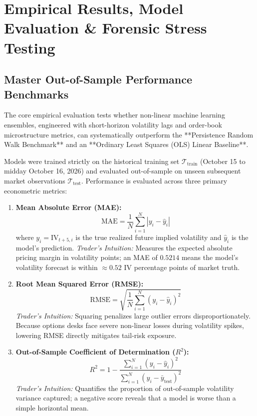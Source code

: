 \chapter{Empirical Results, Model Evaluation \& Forensic Stress Testing}
\label{chap:results}

\section{Master Out-of-Sample Performance Benchmarks}
\label{sec:master_benchmarks}

The core empirical evaluation tests whether non-linear machine learning ensembles, engineered with short-horizon volatility lags and order-book microstructure metrics, can systematically outperform the **Persistence Random Walk Benchmark** and an **Ordinary Least Squares (OLS) Linear Baseline**.

Models were trained strictly on the historical training set $\mathcal{T}_{\text{train}}$ (October 15 to midday October 16, 2026) and evaluated out-of-sample on unseen subsequent market observations $\mathcal{T}_{\text{test}}$. Performance is evaluated across three primary econometric metrics:
\begin{enumerate}
    \item \textbf{Mean Absolute Error (MAE):}
    \begin{equation}
        \text{MAE} = \frac{1}{N} \sum_{i=1}^N \left| y_i - \widehat{y}_i \right|
    \end{equation}
    where $y_i = \text{IV}_{t+5, i}$ is the true realized future implied volatility and $\widehat{y}_i$ is the model's prediction.
    \textit{Trader's Intuition:} Measures the expected absolute pricing margin in volatility points; an MAE of $0.5214$ means the model's volatility forecast is within $\approx 0.52$ IV percentage points of market truth.

    \item \textbf{Root Mean Squared Error (RMSE):}
    \begin{equation}
        \text{RMSE} = \sqrt{\frac{1}{N} \sum_{i=1}^N (y_i - \widehat{y}_i)^2}
    \end{equation}
    \textit{Trader's Intuition:} Squaring penalizes large outlier errors disproportionately. Because options desks face severe non-linear losses during volatility spikes, lowering RMSE directly mitigates tail-risk exposure.

    \item \textbf{Out-of-Sample Coefficient of Determination ($R^2$):}
    \begin{equation}
        R^2 = 1 - \frac{\sum_{i=1}^N (y_i - \widehat{y}_i)^2}{\sum_{i=1}^N (y_i - \bar{y}_{\text{test}})^2}
    \end{equation}
    \textit{Trader's Intuition:} Quantifies the proportion of out-of-sample volatility variance captured; a negative score reveals that a model is worse than a simple horizontal mean.
\end{enumerate}

